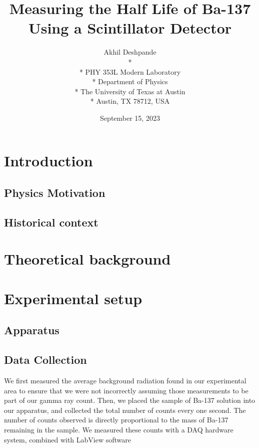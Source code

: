 \documentclass[10pt,letterpaper,onecolumn]{article}
\begin{document}
\title{\Large\bf Measuring the Half Life of Ba-137 Using a Scintillator Detector}
\author{
 Akhil Deshpande \\*
  \\*
 PHY 353L Modern Laboratory \\*
 Department of Physics \\*
 The University of Texas at Austin \\*
 Austin, TX 78712, USA
}
\date{September 15, 2023}



\maketitle
\begin{abstract}
\end{abstract}
\section{Introduction}
\subsection{Physics Motivation}
\subsection{Historical context}
\section{Theoretical background}
\section{Experimental setup}
\subsection{Apparatus}
\subsection{Data Collection}

We first measured the average background radiation found in our experimental
area to ensure that we were not incorrectly assuming those measurements to be 
part of our gamma ray count. Then, we placed the sample of Ba-137 solution into
our apparatus, and collected the total number of counts every one second. The
number of counts observed is directly proportional to the mass of Ba-137 remaining
in the sample. We measured these counts with a DAQ hardware system, combined with
LabView software
\end{document}
